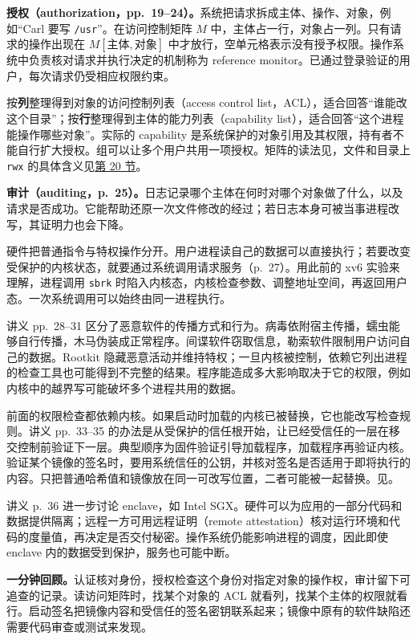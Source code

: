 \textbf{授权（authorization，pp.~19--24）。}系统把请求拆成主体、操作、对象，例如“Carl 要写 \texttt{/usr}”。在访问控制矩阵 $M$ 中，主体占一行，对象占一列。只有请求的操作出现在 $M[\text{主体},\text{对象}]$ 中才放行，空单元格表示没有授予权限。操作系统中负责核对请求并执行决定的机制称为 reference monitor。已通过登录验证的用户，每次请求仍受相应权限约束。

按\textbf{列}整理得到对象的访问控制列表（access control list，ACL），适合回答“谁能改这个目录”；按\textbf{行}整理得到主体的能力列表（capability list），适合回答“这个进程能操作哪些对象”。实际的 capability 是系统保护的对象引用及其权限，持有者不能自行扩大授权。组可以让多个用户共用一项授权。矩阵的读法见，文件和目录上 \texttt{rwx} 的具体含义见\hyperref[topic:SC2005-L20-T03]{第 20 节}。

\textbf{审计（auditing，p.~25）。}日志记录哪个主体在何时对哪个对象做了什么，以及请求是否成功。它能帮助还原一次文件修改的经过；若日志本身可被当事进程改写，其证明力也会下降。

硬件把普通指令与特权操作分开。用户进程读自己的数据可以直接执行；若要改变受保护的内核状态，就要通过系统调用请求服务（p.~27）。用此前的 xv6 实验来理解，进程调用 \texttt{sbrk} 时陷入内核态，内核检查参数、调整地址空间，再返回用户态。一次系统调用可以始终由同一进程执行。

讲义 pp.~28--31 区分了恶意软件的传播方式和行为。病毒依附宿主传播，蠕虫能够自行传播，木马伪装成正常程序。间谍软件窃取信息，勒索软件限制用户访问自己的数据。Rootkit 隐藏恶意活动并维持特权；一旦内核被控制，依赖它列出进程的检查工具也可能得到不完整的结果。程序能造成多大影响取决于它的权限，例如内核中的越界写可能破坏多个进程共用的数据。

前面的权限检查都依赖内核。如果启动时加载的内核已被替换，它也能改写检查规则。讲义 pp.~33--35 的办法是从受保护的信任根开始，让已经受信任的一层在移交控制前验证下一层。典型顺序为固件验证引导加载程序，加载程序再验证内核。验证某个镜像的签名时，要用系统信任的公钥，并核对签名是否适用于即将执行的内容。只把普通哈希值和镜像放在同一可改写位置，二者可能被一起替换。见。

\begin{center}
\end{center}

讲义 p.~36 进一步讨论 enclave，如 Intel SGX。硬件可以为应用的一部分代码和数据提供隔离；远程一方可用远程证明（remote attestation）核对运行环境和代码的度量值，再决定是否交付秘密。操作系统仍能影响进程的调度，因此即使 enclave 内的数据受到保护，服务也可能中断。

\textbf{一分钟回顾。}认证核对身份，授权检查这个身份对指定对象的操作权，审计留下可追查的记录。读访问矩阵时，找某个对象的 ACL 就看列，找某个主体的权限就看行。启动签名把镜像内容和受信任的签名密钥联系起来；镜像中原有的软件缺陷还需要代码审查或测试来发现。
\endgroup
